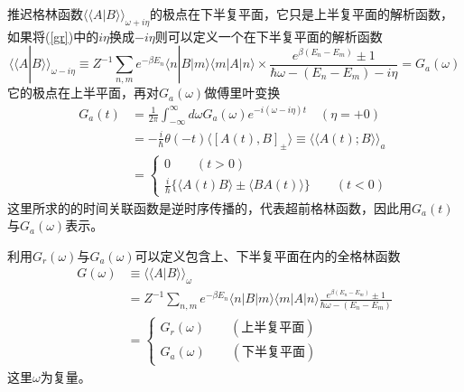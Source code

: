  推迟格林函数$\langle\langle A|B\rangle\rangle_{\omega+i\eta}$的极点在下半复平面，它只是上半复平面的解析函数，如果将(\ref{gr})中的$i\eta$换成$-i\eta$则可以定义一个在下半复平面的解析函数
\begin{equation}
\langle\langle A|B\rangle\rangle_{\omega-i\eta}\equiv Z^{-1}\sum_{n,m}e^{-\beta E_n}\langle n|B|m\rangle\langle m|A|n\rangle\times \frac{e^{\beta(E_n-E_m)}\pm 1}{\hbar\omega-(E_n-E_m)-i\eta}=G_a(\omega)\label{gf4}
\end{equation}
它的极点在上半平面，再对$G_a(\omega)$做傅里叶变换
\begin{equation}
\begin{aligned}
G_a(t)&=\frac{1}{2\pi}\int_{-\infty}^{\infty}d\omega G_a(\omega)e^{-i(\omega-i\eta)t}\quad(\eta=+0)\\
&=-\frac{i}{\hbar}\theta(-t)\langle\left[A(t),B\right]_\pm\rangle\equiv\langle\langle A(t);B\rangle\rangle_a\\
&=\left\{
\begin{array}{cc}
0\qquad(t>0)\\
\frac{i}{\hbar}\{\langle A(t)B\rangle\pm\langle BA(t)\rangle\}\qquad(t<0)
\end{array}
\right.
\end{aligned}
\end{equation}
这里所求的的时间关联函数是逆时序传播的，代表超前格林函数，因此用$G_a(t)$与$G_a(\omega)$表示。

 利用$G_r(\omega)$与$G_a(\omega)$可以定义包含上、下半复平面在内的全格林函数
\begin{equation}
\begin{aligned}
G(\omega)&\equiv\langle\langle A|B\rangle\rangle_\omega\\
&=Z^{-1}\sum_{n,m}e^{-\beta E_n}\langle n|B|m\rangle\langle m|A|n\rangle\frac{e^{\beta(E_n-E_m)}\pm 1}{\hbar\omega-(E_n-E_m)}\\
&=\left\{
\begin{array}{cc}
G_r(\omega)\qquad(\textrm{上半复平面})\\
G_a(\omega)\qquad(\textrm{下半复平面})
\end{array}\right.\label{gf5}
\end{aligned}
\end{equation}
这里$\omega$为复量。

